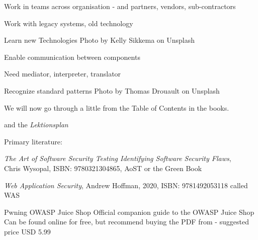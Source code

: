 \documentclass[Screen16to9,17pt]{foils}
\begin{document}


\begin{list2}
\item Work in teams across organisation - and partners, vendors, sub-contractors
\item Work with legacy systems, old technology
\item Learn new Technologies \hfill Photo by Kelly Sikkema on Unsplash
\end{list2}







\begin{list2}
\item Enable communication between components
\item Need mediator, interpreter, translator
\item Recognize standard patterns \hfill Photo by Thomas Drouault on Unsplash
\end{list2}



We will now go through a little from the Table of Contents in the books.

and the \emph{Lektionsplan}\\



Primary literature:
\begin{list2}
\item \emph{The Art of Software Security Testing Identifying Software Security Flaws},\\
Chris Wysopal, ISBN: 9780321304865, AoST or the Green Book
\item \emph{Web Application Security}, Andrew Hoffman, 2020, ISBN: 9781492053118 called WAS
\item Pwning OWASP Juice Shop Official companion guide to the OWASP Juice Shop
Can be found online for free, but recommend buying the PDF from  - suggested price USD 5.99


\end{list2}
\end{document}
